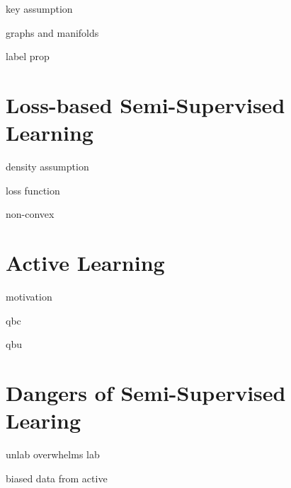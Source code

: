 key assumption

graphs and manifolds

label prop

\section{Loss-based Semi-Supervised Learning}

density assumption

loss function

non-convex

\section{Active Learning}

motivation

qbc

qbu

\section{Dangers of Semi-Supervised Learing}

unlab overwhelms lab

biased data from active


\begin{exercises}
\begin{Ex}
\TODO

\begin{solution}
\TODO
\end{solution}
\end{Ex}

\end{exercises}
